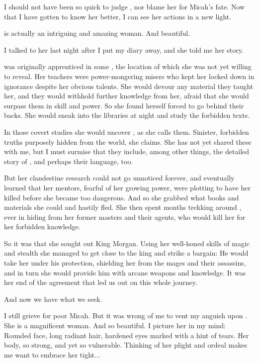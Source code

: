 \begin{diary}%
\diarystamp{\dateEreshKalLeftBehindDayOne}

\new
I should not have been so quick to judge \Takestsha, nor blame her for Micah's fate. 
Now that I have gotten to know her better, I can see her actions in a new light. 

\Takestsha{} is actually an intriguing and amazing woman. 
And beautiful. 

I talked to her last night after I put my diary away, and she told me her story. 

\Takestsha{} was originally apprenticed in some \ishrah{}, the location of which she was not yet willing to reveal. 
Her teachers were power-mongering misers who kept her locked down in ignorance despite her obvious talents. 
She would devour any material they taught her, and they would withhold further knowledge from her, afraid that she would surpass them in skill and power. 
So she found herself forced to go behind their backs. 
She would sneak into the libraries at night and study the forbidden texts. 

In those covert studies she would uncover , as she calls them. 
Sinister, forbidden truths purposely hidden from the world, she claims. 
She has not yet shared these  with me, but I must surmise that they include, among other things, the detailed story of \EreshKal, and perhaps their language, too. 

But her clandestine research could not go unnoticed forever, and eventually \Takestsha{} learned that her mentors, fearful of her growing power, were plotting to have her killed before she became too dangerous. 
And so she grabbed what books and materials she could and hastily fled. 
She then spent months trekking around \Velcad, ever in hiding from her former masters and their agents, who would kill her for her forbidden knowledge. 

So it was that she sought out King Morgan. 
Using her well-honed skills of magic and stealth she managed to get close to the king and strike a bargain: 
He would take her under his protection, shielding her from the mages and their assassins, and in turn she would provide him with arcane weapons and knowledge. 
It was her end of the agreement that led us out on this whole journey. 

And now we have what we seek. 

I still grieve for poor Micah. 
But it was wrong of me to vent my anguish upon \Takestsha. 
She is a magnificent woman. 
And so beautiful. 
I picture her in my mind: 
Rounded face, long radiant hair, hardened eyes marked with a hint of tears. 
Her body, so strong, and yet so vulnerable. 
Thinking of her plight and ordeal makes me want to embrace her tight... 









\end{diary}









